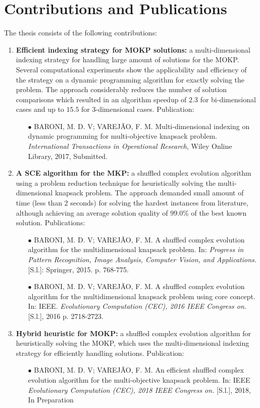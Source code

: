 \section{Contributions and Publications}

The thesis consists of the following contributions:
\begin{enumerate}
\item{
\textbf{Efficient indexing strategy for MOKP solutions:}
a multi-dimensional indexing strategy for handling large amount
of solutions for the MOKP.
Several computational experiments show the applicability and efficiency
of the strategy on a dynamic programming algorithm for exactly solving
the problem.
The approach considerably reduces the number of solution
comparisons which resulted in an algorithm speedup of $2.3$ for 
bi-dimensional cases and up to $15.5$ for 3-dimensional cases.
Publication:
\begin{itemize}
 \item[{\tiny$\bullet$}] { BARONI, M. D. V; VAREJ\~AO, F. M. Multi-dimensional indexing on dynamic programming for multi-objective knapsack problem. \textit{International Transactions in Operational Research}, Wiley Online Library, 2017, Submitted. }
\end{itemize}
}
\item{
\textbf{A SCE algorithm for the MKP:}
a shuffled complex evolution algorithm using a
problem reduction technique for heuristically solving the multi-dimensional
knapsack problem.
The approach demanded small amount of time (less than 2 seconds)
for solving the hardest instances from literature,
although achieving an average solution quality of $99.0\%$
of the best known solution.
Publications:
\begin{itemize}
  \item[{\tiny$\bullet$}] { BARONI, M. D. V; VAREJ\~AO, F. M. A shuffled complex evolution algorithm
  for the multidimensional knapsack problem. In: \textit{Progress in Pattern Recognition, Image Analysis, Computer Vision, and Applications.} [S.l.]: Springer, 2015. p. 768-775. }
 \item[{\tiny$\bullet$}] { BARONI, M. D. V; VAREJ\~AO, F. M. A shuffled complex evolution algorithm
  for the multidimensional knapsack problem using core concept. In: IEEE. \textit{Evolutionary Computation (CEC), 2016 IEEE Congress on.} [S.l.], 2016 p. 2718-2723. }
\end{itemize}
}
\item{
\textbf{Hybrid heuristic for MOKP:}
a shuffled complex evolution algorithm for
heuristically solving the MOKP, which uses the multi-dimensional
indexing strategy for efficiently handling solutions.
Publication:
\begin{itemize}
 \item[{\tiny$\bullet$}] { BARONI, M. D. V; VAREJ\~AO, F. M. An efficient shuffled complex evolution algorithm for the multi-objective knapsack problem. In: IEEE \textit{Evolutionary Computation (CEC), 2018 IEEE Congress on.} [S.l.], 2018, In Preparation }
\end{itemize}
}
\end{enumerate}

